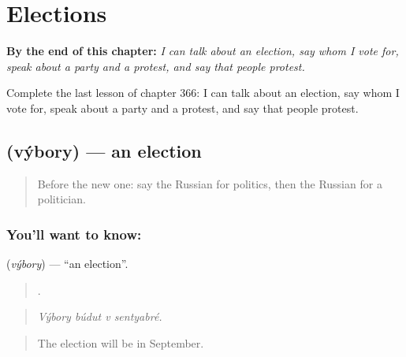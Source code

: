 
\chapter{Elections}
\label{ch:ru-elections}

\begin{chapteropening}
\textbf{By the end of this chapter:} \emph{I can talk about an election, say whom I vote for, speak about a party and a protest, and say that people protest.}

Complete the last lesson of chapter 366: I can talk about an election, say whom I vote for, speak about a party and a protest, and say that people protest.
\end{chapteropening}

\section[\texorpdfstring{\ru{выборы} (výbory)}{выборы (výbory)}]{ (výbory) — an election}

\label{lesson:RU-C366-vybory}



\begin{quote}
Before the new one: say the Russian for politics, then the Russian for a politician.
\end{quote}

\subsection*{You'll want to know: }
\textbf{} (\emph{výbory}) — \textquotedblleft{}an election\textquotedblright{}.

\begin{quote}
   .
\end{quote}

\begin{quote}
\emph{Výbory búdut v sentyabré.}
\end{quote}

\begin{quote}
The election will be in September.
\end{quote}

